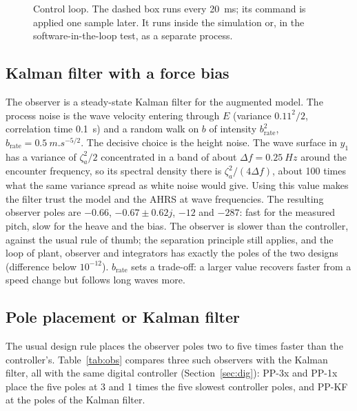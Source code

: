 \documentclass[conference]{IEEEtran}
\begin{document}
\begin{figure}[t]
\centering

\caption{Control loop. The dashed box runs every \SI{20}{ms}; its command is
applied one sample later. It runs inside the simulation or, in the
software-in-the-loop test, as a separate process.}
\label{fig:loop}
\end{figure}

\subsection{Kalman filter with a force bias}

The observer is a steady-state Kalman filter for the augmented model. The
process noise is the wave velocity entering through $E$ (variance
$0.11^2/2$, correlation time \SI{0.1}{s}) and a random walk on $b$ of intensity
$b_{\mathrm{rate}}^2$, $b_{\mathrm{rate}}=\SI{0.5}{m.s^{-5/2}}$. The decisive
choice is the height noise. The wave surface in $y_1$ has a variance of
$\zeta_a^2/2$ concentrated in a band of about $\Delta f=\SI{0.25}{Hz}$ around the
encounter frequency, so its spectral density there is $\zeta_a^2/(4\Delta f)$,
about 100 times what the same variance spread as white noise would give. Using
this value makes the filter trust the model and the AHRS at wave frequencies.
The resulting observer poles are $-0.66$, $-0.67\pm0.62j$, $-12$ and $-287$:
fast for the measured pitch, slow for the heave and the bias. The observer is
slower than the controller, against the usual rule of thumb; the separation
principle still applies, and the loop of plant, observer and integrators has
exactly the poles of the two designs (difference below $10^{-12}$).
$b_{\mathrm{rate}}$ sets a trade-off: a larger value recovers faster from a
speed change but follows long waves more.

\subsection{Pole placement or Kalman filter}

The usual design rule places the observer poles two to five times faster than
the controller's. Table~\ref{tab:obs} compares three such observers with
the Kalman filter, all with the same digital controller (Section~\ref{sec:dig}):
PP-3x and PP-1x place the five poles at 3 and 1 times the five slowest
controller poles, and PP-KF at the poles of the Kalman filter.
\end{document}

